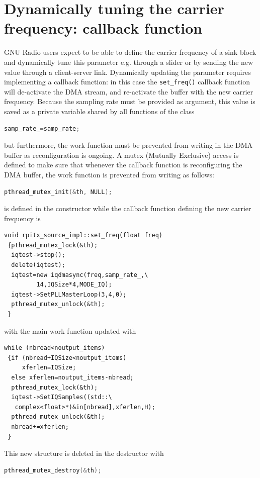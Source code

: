 \documentclass{article}
\begin{document}
\section{Dynamically tuning the carrier frequency: callback function}

GNU Radio users expect to be able to define the carrier frequency of
a sink block and dynamically tune this parameter e.g. through a slider
or by sending the new value through a client-server link. Dynamically
updating the parameter requires implementing a callback function: in this
case the {\tt set\_freq()} callback function will de-activate the DMA
stream, and re-activate the buffer with the new carrier frequency. Because
the sampling rate must be provided as argument, this value is saved as a 
private variable shared by all functions of the class
\begin{lstlisting}[language=C]
samp_rate_=samp_rate;
\end{lstlisting}
but furthermore, the work function must be prevented from writing in the DMA
buffer as reconfiguration is ongoing. A mutex (Mutually Exclusive) access is defined
to make sure that whenever the callback function is reconfiguring the DMA buffer,
the work function is prevented from writing as follows:
\begin{lstlisting}[language=C]
pthread_mutex_init(&th, NULL);
\end{lstlisting}
is defined in the constructor while the callback function defining the new carrier
frequency is
\begin{lstlisting}
void rpitx_source_impl::set_freq(float freq)
 {pthread_mutex_lock(&th);
  iqtest->stop();
  delete(iqtest);
  iqtest=new iqdmasync(freq,samp_rate_,\
         14,IQSize*4,MODE_IQ);
  iqtest->SetPLLMasterLoop(3,4,0);
  pthread_mutex_unlock(&th);
 }
\end{lstlisting}

with the main work function updated with
\begin{lstlisting}
while (nbread<noutput_items)
 {if (nbread+IQSize<noutput_items) 
     xferlen=IQSize; 
  else xferlen=noutput_items-nbread;
  pthread_mutex_lock(&th);
  iqtest->SetIQSamples((std::\
   complex<float>*)&in[nbread],xferlen,H);
  pthread_mutex_unlock(&th);
  nbread+=xferlen;
 }
\end{lstlisting}

This new structure is deleted in the destructor with
\begin{lstlisting}[language=C]
pthread_mutex_destroy(&th);
\end{lstlisting}
\end{document}
